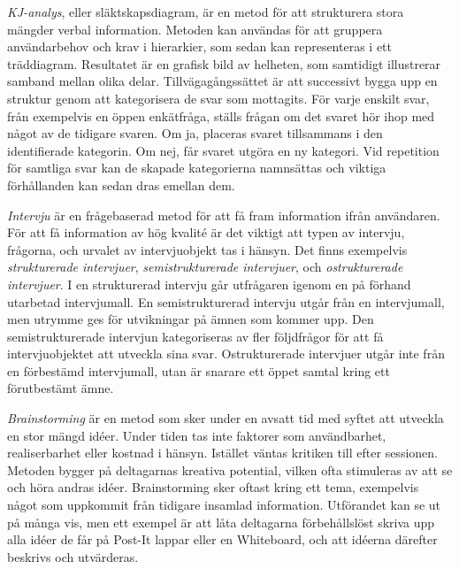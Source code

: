 \emph{KJ-analys}, eller släktskapsdiagram, är en metod för att strukturera stora mängder verbal information. Metoden kan användas för att gruppera användarbehov och krav i hierarkier, som sedan kan representeras i ett träddiagram. Resultatet är en grafisk bild av helheten, som samtidigt illustrerar samband mellan olika delar. Tillvägagångssättet är att successivt bygga upp en struktur genom att kategorisera de svar som mottagits. För varje enskilt svar, från exempelvis en öppen enkätfråga, ställs frågan om det svaret hör ihop med något av de tidigare svaren. Om ja, placeras svaret tillsammans i den identifierade kategorin. Om nej, får svaret utgöra en ny kategori. Vid repetition för samtliga svar kan de skapade kategorierna namnsättas och viktiga förhållanden kan sedan dras emellan dem. 

\emph{Intervju} är en frågebaserad metod för att få fram information ifrån användaren. För att få information av hög kvalité är det viktigt att typen av intervju, frågorna, och urvalet av intervjuobjekt tas i hänsyn. Det finns exempelvis \emph{strukturerade intervjuer}, \emph{semistrukturerade intervjuer}, och \emph{ostrukturerade intervjuer}. I en strukturerad intervju går utfrågaren igenom en på förhand utarbetad intervjumall. En semistrukturerad intervju utgår från en intervjumall, men utrymme ges för utvikningar på ämnen som kommer upp. Den semistrukturerade intervjun kategoriseras av fler följdfrågor för att få intervjuobjektet att utveckla sina svar. Ostrukturerade intervjuer utgår inte från en förbestämd intervjumall, utan är snarare ett öppet samtal kring ett förutbestämt ämne. 


\emph{Brainstorming} är en metod som sker under en avsatt tid med syftet att utveckla en stor mängd idéer. Under tiden tas inte faktorer som användbarhet, realiserbarhet eller kostnad i hänsyn. Istället väntas kritiken till efter sessionen. Metoden bygger på deltagarnas kreativa potential, vilken ofta stimuleras av att se och höra andras idéer. Brainstorming sker oftast kring ett tema, exempelvis något som uppkommit från tidigare insamlad information. Utförandet kan se ut på många vis, men ett exempel är att låta deltagarna förbehållslöst skriva upp alla idéer de får på Post-It lappar eller en Whiteboard, och att idéerna därefter beskrivs och utvärderas.  

